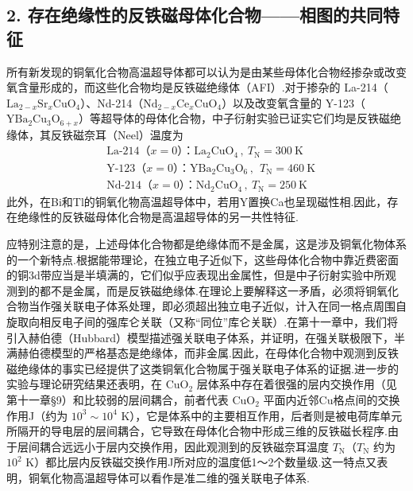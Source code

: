 \subsection*{2. 存在绝缘性的反铁磁母体化合物——相图的共同特征}

所有新发现的铜氧化合物高温超导体都可以认为是由某些母体化合物经掺杂或改变氧含量形成的，而这些化合物均是反铁磁绝缘体（AFI）.对于掺杂的 La-214（$\mathrm{La}_{2-x}\mathrm{Sr}_{x}\mathrm{CuO}_{4}$）、Nd-214（$\mathrm{Nd}_{2-x}\mathrm{Ce}_{x}\mathrm{CuO}_{4}$）以及改变氧含量的 Y-123（$\mathrm{YBa}_{2}\mathrm{Cu}_{3}\mathrm{O}_{6+x}$）等超导体的母体化合物，中子衍射实验已证实它们均是反铁磁绝缘体，其反铁磁奈耳（Neel）温度为
\begin{equation*}
\begin{aligned}
&\text{La-214（$x=0$）：}\mathrm{La}_{2}\mathrm{CuO}_{4}\,,\ T_{\mathrm{N}}=300\ \mathrm{K}\\
&\text{Y-123（$x=0$）：}\mathrm{YBa}_{2}\mathrm{Cu}_{3}\mathrm{O}_{6}\,,\ \ T_{\mathrm{N}}=460\ \mathrm{K}\\
&\text{Nd-214（$x=0$）：}\mathrm{Nd}_{2}\mathrm{CuO}_{4}\,,\ T_{\mathrm{N}}=250\ \mathrm{K}
\end{aligned}
\end{equation*}
此外，在Bi和Tl的铜氧化物高温超导体中，若用Y置换Ca也呈现磁性相.因此，存在绝缘性的反铁磁母体化合物是高温超导体的另一共性特征.

应特别注意的是，上述母体化合物都是绝缘体而不是金属，这是涉及铜氧化物体系的一个新特点.根据能带理论，在独立电子近似下，这些母体化合物中靠近费密面的铜3d带应当是半填满的，它们似乎应表现出金属性，但是中子衍射实验中所观测到的都不是金属，而是反铁磁绝缘体.在理论上要解释这一矛盾，必须将铜氧化合物当作强关联电子体系处理，即必须超出独立电子近似，计入在同一格点周围自旋取向相反电子间的强库仑关联（又称“同位”库仑关联）.在第十一章中，我们将引入赫伯德（Hubbard）模型描述强关联电子体系，并证明，在强关联极限下，半满赫伯德模型的严格基态是绝缘体，而非金属.因此，在母体化合物中观测到反铁磁绝缘体的事实已经提供了这类铜氧化合物属于强关联电子体系的证据.进一步的实验与理论研究结果还表明，在 $\mathrm{CuO}_{2}$ 层体系中存在着很强的层内交换作用（见第十一章§9）和比较弱的层间耦合，前者代表 $\mathrm{CuO}_{2}$ 平面内近邻Cu格点间的交换作用J（约为 $10^{3}\sim10^{4}$ K），它是体系中的主要相互作用，后者则是被电荷库单元所隔开的导电层的层间耦合，它导致在母体化合物中形成三维的反铁磁长程序.由于层间耦合远远小于层内交换作用，因此观测到的反铁磁奈耳温度 $T_{\mathrm{N}}$（$T_{\mathrm{N}}$ 约为 $10^{2}$ K）都比层内反铁磁交换作用J所对应的温度低1～2个数量级.这一特点又表明，铜氧化物高温超导体可以看作是准二维的强关联电子体系.

